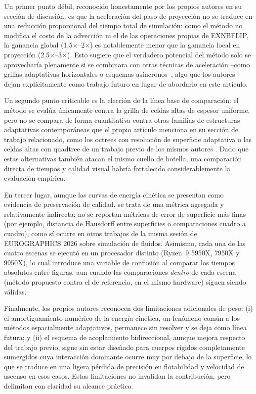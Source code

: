 \documentclass[sigconf,nonacm]{acmart}
\begin{document}
Un primer punto débil, reconocido honestamente por los propios autores en su sección de discusión, es que la aceleración del paso de proyección no se traduce en una reducción proporcional del tiempo total de simulación: como el método no modifica el costo de la advección ni el de las operaciones propias de EXNBFLIP, la ganancia global (1.5$\times$--2$\times$) es notablemente menor que la ganancia local en proyección (2.5$\times$--3$\times$). Esto sugiere que el verdadero potencial del método solo se aprovecharía plenamente si se combinara con otras técnicas de aceleración --como grillas adaptativas horizontales o esquemas asíncronos--, algo que los autores dejan explícitamente como trabajo futuro en lugar de abordarlo en este artículo.

Un segundo punto criticable es la elección de la línea base de comparación: el método se evalúa únicamente contra la grilla de celdas altas de espesor uniforme, pero no se compara de forma cuantitativa contra otras familias de estructuras adaptativas contemporáneas que el propio artículo menciona en su sección de trabajo relacionado, como los octrees con resolución de superficie adaptativa o las celdas altas con quadtree de un trabajo previo de los mismos autores \cite{narita2026}. Dado que estas alternativas también atacan el mismo cuello de botella, una comparación directa de tiempos y calidad visual habría fortalecido considerablemente la evaluación empírica.

En tercer lugar, aunque las curvas de energía cinética se presentan como evidencia de preservación de calidad, se trata de una métrica agregada y relativamente indirecta: no se reportan métricas de error de superficie más finas (por ejemplo, distancia de Hausdorff entre superficies o comparaciones cuadro a cuadro), como sí ocurre en otros trabajos de la misma sesión de EUROGRAPHICS 2026 sobre simulación de fluidos. Asimismo, cada una de las cuatro escenas se ejecutó en un procesador distinto (Ryzen~9 5950X, 7950X y 9950X), lo cual introduce una variable de confusión al comparar los tiempos absolutos entre figuras, aun cuando las comparaciones \emph{dentro} de cada escena (método propuesto contra el de referencia, en el mismo hardware) siguen siendo válidas.

Finalmente, los propios autores reconocen dos limitaciones adicionales de peso: (i) el amortiguamiento numérico de la energía cinética, un fenómeno común a los métodos espacialmente adaptativos, permanece sin resolver y se deja como línea futura; y (ii) el esquema de acoplamiento bidireccional, aunque mejora respecto del trabajo previo, sigue sin estar diseñado para cuerpos rígidos completamente sumergidos cuya interacción dominante ocurre muy por debajo de la superficie, lo que se traduce en una ligera pérdida de precisión en flotabilidad y velocidad de ascenso en esos casos. Estas limitaciones no invalidan la contribución, pero delimitan con claridad su alcance práctico.
\end{document}
